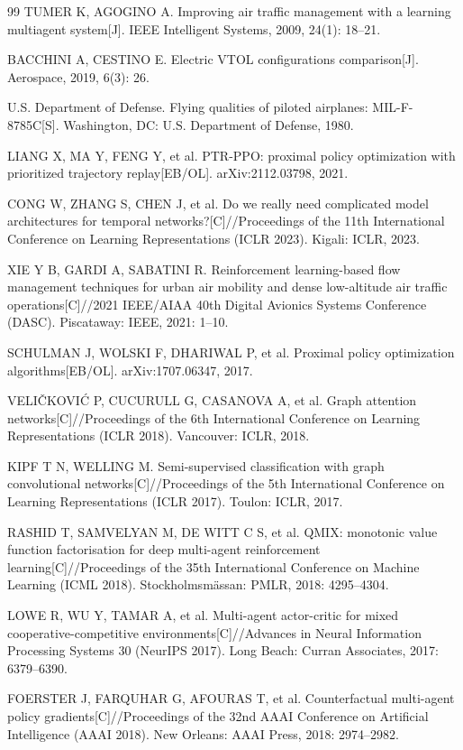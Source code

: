 \documentclass[12pt,a4paper,UTF8]{ctexart}
\begin{document}
\begin{thebibliography}{99}
 TUMER K, AGOGINO A. Improving air traffic management with a learning multiagent system[J]. IEEE Intelligent Systems, 2009, 24(1): 18--21.

 BACCHINI A, CESTINO E. Electric VTOL configurations comparison[J]. Aerospace, 2019, 6(3): 26.

 U.S. Department of Defense. Flying qualities of piloted airplanes: MIL-F-8785C[S]. Washington, DC: U.S. Department of Defense, 1980.

 LIANG X, MA Y, FENG Y, et al. PTR-PPO: proximal policy optimization with prioritized trajectory replay[EB/OL]. arXiv:2112.03798, 2021.

 CONG W, ZHANG S, CHEN J, et al. Do we really need complicated model architectures for temporal networks?[C]//Proceedings of the 11th International Conference on Learning Representations (ICLR 2023). Kigali: ICLR, 2023.

 XIE Y B, GARDI A, SABATINI R. Reinforcement learning-based flow management techniques for urban air mobility and dense low-altitude air traffic operations[C]//2021 IEEE/AIAA 40th Digital Avionics Systems Conference (DASC). Piscataway: IEEE, 2021: 1--10.

 SCHULMAN J, WOLSKI F, DHARIWAL P, et al. Proximal policy optimization algorithms[EB/OL]. arXiv:1707.06347, 2017.

 VELI\v{C}KOVI\'C P, CUCURULL G, CASANOVA A, et al. Graph attention networks[C]//Proceedings of the 6th International Conference on Learning Representations (ICLR 2018). Vancouver: ICLR, 2018.

 KIPF T N, WELLING M. Semi-supervised classification with graph convolutional networks[C]//Proceedings of the 5th International Conference on Learning Representations (ICLR 2017). Toulon: ICLR, 2017.

 RASHID T, SAMVELYAN M, DE WITT C S, et al. QMIX: monotonic value function factorisation for deep multi-agent reinforcement learning[C]//Proceedings of the 35th International Conference on Machine Learning (ICML 2018). Stockholmsm\"{a}ssan: PMLR, 2018: 4295--4304.

 LOWE R, WU Y, TAMAR A, et al. Multi-agent actor-critic for mixed cooperative-competitive environments[C]//Advances in Neural Information Processing Systems 30 (NeurIPS 2017). Long Beach: Curran Associates, 2017: 6379--6390.

 FOERSTER J, FARQUHAR G, AFOURAS T, et al. Counterfactual multi-agent policy gradients[C]//Proceedings of the 32nd AAAI Conference on Artificial Intelligence (AAAI 2018). New Orleans: AAAI Press, 2018: 2974--2982.


\end{thebibliography}
\end{document}
